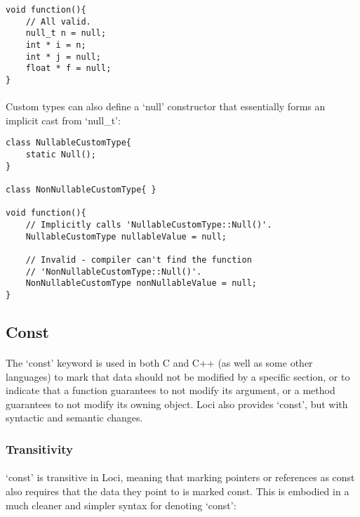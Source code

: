\documentclass[12pt,twoside,notitlepage]{report}
\begin{document}
\begin{lstlisting}
void function(){
	// All valid.
	null_t n = null;
	int * i = n;
	int * j = null;
	float * f = null;
}
\end{lstlisting}


\paragraph{}
Custom types can also define a `null' constructor that essentially forms an implicit cast from `null\_t':

\begin{lstlisting}
class NullableCustomType{
	static Null();
}

class NonNullableCustomType{ }

void function(){
	// Implicitly calls 'NullableCustomType::Null()'.
	NullableCustomType nullableValue = null;
	
	// Invalid - compiler can't find the function
	// 'NonNullableCustomType::Null()'.
	NonNullableCustomType nonNullableValue = null;
}
\end{lstlisting}

\clearpage

\subsection{Const}

\paragraph{}
The `const' keyword is used in both C and C++ (as well as some other languages) to mark that data should not be modified by a specific section, or to indicate that a function guarantees to not modify its argument, or a method guarantees to not modify its owning object. Loci also provides `const', but with syntactic and semantic changes.

\subsubsection{Transitivity}

\paragraph{}
`const' is transitive in Loci, meaning that marking pointers or references as const also requires that the data they point to is marked const. This is embodied in a much cleaner and simpler syntax for denoting `const':
\end{document}
